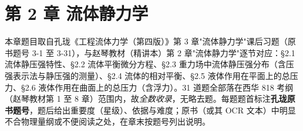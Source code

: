 \chapter*{第 2 章 流体静力学}

\begin{tishi}
本章题目取自孔珑《工程流体力学（第四版）》第 3 章"流体静力学"课后习题（原书题号 3-1 至 3-31），与赵琴教材（精讲本）第 2 章"流体静力学"逐节对应：\S 2.1 流体静压强特性、\S 2.2 流体平衡微分方程、\S 2.3 重力场中流体静压强分布（含压强表示法与静压强的测量）、\S 2.4 流体的相对平衡、\S 2.5 液体作用在平面上的总压力、\S 2.6 液体作用在曲面上的总压力（含浮力）。31 道题全部落在西华 818 考纲（赵琴教材第 1 至 8 章）范围内，故\emph{全数收录}，无略去题。每题题首标注\textbf{孔珑原书题号}，题后给出重要度（星级）、依据与难度；原书（或其 OCR 文本）中明显不合物理量纲或不便阅读之处，在章末按题号列出说明。
\end{tishi}

